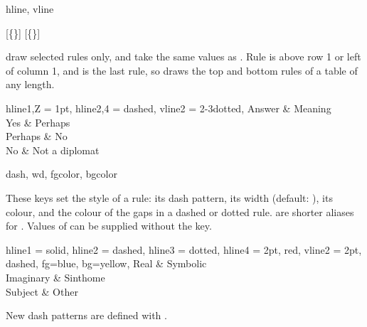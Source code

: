 \begin{codedescribe}[
    key,
    new=2021F
  ]{hline, vline}
  \begin{codesyntax}
    [\{\}]
    [\{\}]
  \end{codesyntax}
   draw selected rules only, and take the same values as . Rule  is above row 1 or left of column 1, and  is the last rule, so  draws the top and bottom rules of a table of any length.

  \begin{codestore}[st=rules:hline]
    \begin{tblr}{
      hline{1,Z} = {1pt},
      hline{2,4} = {dashed},
          vline{2} = {2-3}{dotted},
        }
      Answer  & Meaning        \\
      Yes     & Perhaps        \\
      Perhaps & No             \\
      No      & Not a diplomat
    \end{tblr}\end{codestore}
  \begin{center}
  \end{center}
\end{codedescribe}

\begin{codedescribe}[
    key,
    new=2021F,
    update=2026A
  ]{dash, wd, fgcolor, bgcolor}
  \begin{codesyntax}
  \end{codesyntax}
  These keys set the style of a rule: its dash pattern, its width (default: \val{0.4pt}), its colour, and the colour of the gaps in a dashed or dotted rule.  are shorter aliases for . Values of  can be supplied without the key.

  \begin{codestore}[st=rules:style]
    \begin{tblr}{
        hline{1} = {solid},
        hline{2} = {dashed},
        hline{3} = {dotted},
        hline{4} = {2pt, red},
        vline{2} = {2pt, dashed, fg=blue, bg=yellow},
      }
      Real      & Symbolic \\
      Imaginary & Sinthome \\
      Subject   & Other
    \end{tblr}\end{codestore}
  \begin{center}
  \end{center}
  \begin{tsremark}
    New dash patterns are defined with .
  \end{tsremark}
\end{codedescribe}

